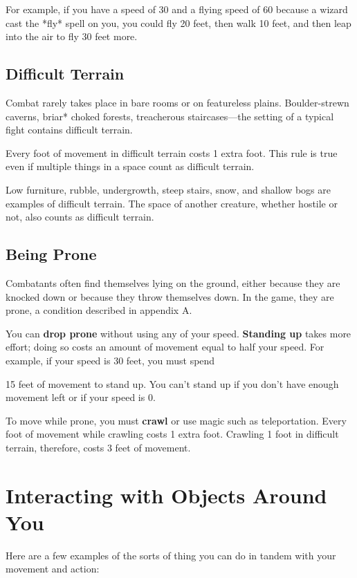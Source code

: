 For example, if you have a speed of 30 and a flying speed of 60 because a wizard cast the *fly* spell on you, you could fly 20 feet, then walk 10 feet, and then leap into the air to fly 30 feet more.

\subsection{Difficult Terrain}

Combat rarely takes place in bare rooms or on featureless plains. Boulder-strewn caverns, briar* choked forests, treacherous staircases—the setting of a typical fight contains difficult terrain.

Every foot of movement in difficult terrain costs 1 extra foot. This rule is true even if multiple things in a space count as difficult terrain.

Low furniture, rubble, undergrowth, steep stairs, snow, and shallow bogs are examples of difficult terrain. The space of another creature, whether hostile or not, also counts as difficult terrain.

\subsection{Being Prone}

Combatants often find themselves lying on the ground, either because they are knocked down or because they throw themselves down. In the game, they are prone, a condition described in appendix A.

You can \textbf{drop prone} without using any of your speed. \textbf{Standing up} takes more effort; doing so costs an amount of movement equal to half your speed. For example, if your speed is 30 feet, you must spend

15 feet of movement to stand up. You can't stand up if you don't have enough movement left or if your speed is 0.

To move while prone, you must \textbf{crawl} or use magic such as teleportation. Every foot of movement while crawling costs 1 extra foot. Crawling 1 foot in difficult terrain, therefore, costs 3 feet of movement.

\section{Interacting with Objects Around You}

Here are a few examples of the sorts of thing you can do in tandem with your movement and action:

